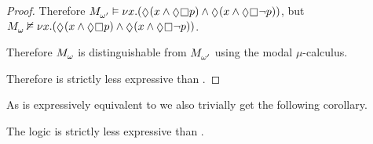 \begin{proof}
Therefore $\kPModel{\omega'} \entails \gfp{\varX} (\possible (\varX \land \possible \necessary \atomP) \land \possible (\varX \land \possible \necessary \neg \atomP))$, 
but $\kPModel{\omega} \nentails \gfp{\varX} (\possible (\varX \land \possible \necessary \atomP) \land \possible (\varX \land \possible \necessary \neg \atomP))$.

Therefore $\kPModel{\omega}$ is distinguishable from $\kPModel{\omega'}$ using the modal $\mu$-calculus.

Therefore \logicRmlKF{} is strictly less expressive than \logicMuKF{}.
\end{proof}

As \logicMuKF{} is expressively equivalent to \logicBqmlKF{} we also trivially get the following corollary. 

\begin{corollary}
The logic \logicRmlKF{} is strictly less expressive than \logicBqmlKF{}.
\end{corollary}
